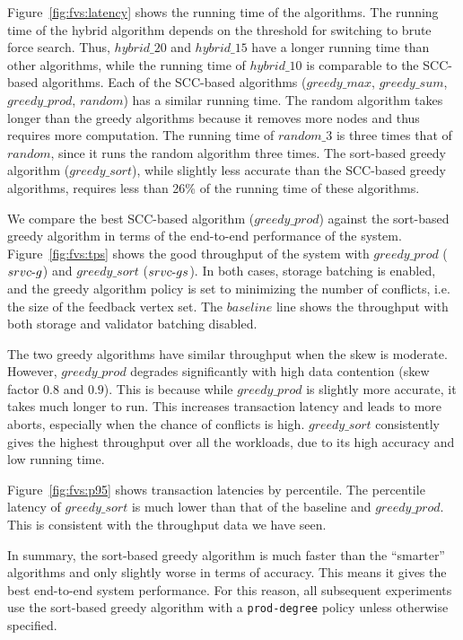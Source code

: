 Figure~\ref{fig:fvs:latency} shows the running time of the algorithms. The running time of the hybrid algorithm depends on the threshold for switching to brute force search. Thus, $hybrid\_20$ and $hybrid\_15$ have a longer running time than other algorithms, while the running time of $hybrid\_10$ is comparable to the SCC-based algorithms. Each of the SCC-based algorithms ($greedy\_max$, $greedy\_sum$, $greedy\_prod$, $random$) has a similar running time. The random algorithm takes longer than the greedy algorithms because it removes more nodes and thus requires more computation. The running time of $random\_3$ is three times that of $random$, since it runs the random algorithm three times. The sort-based greedy algorithm ($greedy\_sort$), while slightly less accurate than the SCC-based greedy algorithms, requires less than 26\% of the running time of these algorithms. 

We compare the best SCC-based algorithm ($greedy\_prod$) against the sort-based greedy algorithm in terms of the end-to-end performance of the system. Figure~\ref{fig:fvs:tps} shows the good throughput of the system with $greedy\_prod$ ($srvc\hbox{-}g$) and $greedy\_sort$ ($srvc\hbox{-}gs$). In both cases, storage batching is enabled, and the greedy algorithm policy is set to minimizing the number of conflicts, i.e. the size of the feedback vertex set. The $baseline$ line shows the throughput with both storage and validator batching disabled. 



The two greedy algorithms have similar throughput when the skew is moderate. However,  $greedy\_prod$ degrades significantly with high data contention (skew factor $0.8$ and $0.9$). This is because while $greedy\_prod$ is slightly more accurate, it takes much longer to run. This increases transaction latency and leads to more aborts, especially when the chance of conflicts is high. $greedy\_sort$ consistently gives the highest throughput over all the workloads, due to its high accuracy and low running time. 

Figure~\ref{fig:fvs:p95} shows transaction latencies by percentile. The percentile latency of $greedy\_sort$ is much lower than that of the baseline and $greedy\_prod$. This is consistent with the throughput data we have seen.

In summary, the sort-based greedy algorithm is much faster than the ``smarter'' algorithms and only slightly worse in terms of accuracy. This means it gives the best end-to-end system performance. For this reason, all subsequent experiments use the sort-based greedy algorithm with a \texttt{prod-degree} policy unless otherwise specified.


